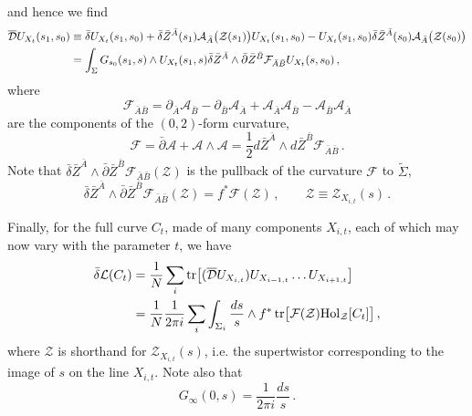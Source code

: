 \documentclass[12pt]{article}
\def \be  {\begin{equation}}
\def \ee  {\end{equation}}
\def \tr {\mathop{\rm tr}\nolimits}
\numberwithin{equation}{section}
\begin{document}
and hence we find
\begin{align}
    \overline{\mathcal{D}} U_{X_t}(s_1,s_0) &\equiv \bar{\delta} U_{X_t}(s_1,s_0) + \bar{\delta} \bar{Z}^{\bar{A}}(s_1)\mathcal{A}_{\bar{A}}\bigl(\mathcal{Z}(s_1)\bigr) U_{X_t}(s_1,s_0) - U_{X_t}(s_1,s_0) \bar{\delta} \bar{Z}^{\bar{A}}(s_0)\mathcal{A}_{\bar{A}}\bigl(\mathcal{Z}(s_0)\bigr) \notag \\
    & = \int_\Sigma G_{s_0}(s_1,s) \wedge U_{X_t}(s_1,s) \bar{\delta} \bar{Z}^{\bar A} \wedge \bar{\partial} \bar{Z}^{\bar B} \mathcal{F}_{\bar{A}\bar{B}} U_{X_t}(s,s_0)\,,
\end{align}
where 
\be
\mathcal{F}_{\bar{A} \bar{B}} = \partial_{\bar A} \mathcal{A}_{\bar B} - \partial_{\bar B} \mathcal{A}_{\bar A} + \mathcal{A}_{\bar{A}} \mathcal{A}_{\bar{B}} - \mathcal{A}_{\bar{B}} \mathcal{A}_{\bar{A}}
\ee
are the components of the $(0,2)$-form curvature,
\be
\mathcal{F} = \bar{\partial} \mathcal{A} + \mathcal{A} \wedge \mathcal{A} = \frac{1}{2} d\bar{Z}^{\bar{A}}\wedge d\bar{Z}^{\bar{B}} \mathcal{F}_{\bar{A} \bar{B}}\,.
\ee
Note that $\bar{\delta} \bar{Z}^{\bar A} \wedge \bar{\partial} \bar{Z}^{\bar B} \mathcal{F}_{\bar{A} \bar{B}}(\mathcal{Z}) $ is the pullback of the curvature $\mathcal{F}$ to $\tilde{\Sigma}$,
\be
\bar{\delta} \bar{Z}^{\bar A} \wedge \bar{\partial} \bar{Z}^{\bar B} \mathcal{F}_{\bar{A} \bar{B}}(\mathcal{Z})  = f^* \mathcal{F}(\mathcal{Z})\,, \qquad  \mathcal{Z} \equiv \mathcal{Z}_{X_{i,t}}(s)  \,.
\ee

Finally, for the full curve $C_t$, made of many components $X_{i,t}$, each of which may now vary with the parameter $t$, we have
\begin{align}
\bar{\delta} \mathcal{L} (C_t) &= \frac{1}{N} \sum_i \tr \bigl[ (\overline{\mathcal{D}}U_{X_{i,t}}) U_{X_{i-1,t}} \ldots U_{X_{i+1,t}}\bigr] \notag \\
&= \frac{1}{N} \frac{1}{2\pi i} \sum_i \int_{\Sigma_i} \frac{ds}{s} \wedge f^* \tr \bigl[ \mathcal{F}(\mathcal{Z}) {\rm Hol}_{\mathcal{Z}}[C_t]\bigr] \,,
\end{align}
where $\mathcal{Z}$ is shorthand for $\mathcal{Z}_{X_{i,t}}(s)$, i.e. the supertwistor corresponding to the image of $s$ on the line $X_{i,t}$. Note also that 
\be
G_{\infty}(0,s) = \frac{1}{2\pi i}\frac{ds}{s}\,.
\ee
\end{document}
